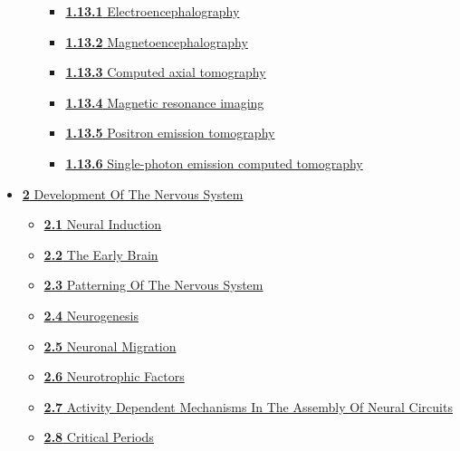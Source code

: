 \begin{itemize}
\begin{itemize}
    \begin{itemize}
    \tightlist
    \item
      \href{the-nervous-system.html\#electroencephalography}{\emph{}\textbf{1.13.1}
      Electroencephalography}
    \item
      \href{the-nervous-system.html\#magnetoencephalography}{\emph{}\textbf{1.13.2}
      Magnetoencephalography}
    \item
      \href{the-nervous-system.html\#computed-axial-tomography}{\emph{}\textbf{1.13.3}
      Computed axial tomography}
    \item
      \href{the-nervous-system.html\#magnetic-resonance-imaging}{\emph{}\textbf{1.13.4}
      Magnetic resonance imaging}
    \item
      \href{the-nervous-system.html\#positron-emission-tomography}{\emph{}\textbf{1.13.5}
      Positron emission tomography}
    \item
      \href{the-nervous-system.html\#single-photon-emission-computed-tomography}{\emph{}\textbf{1.13.6}
      Single-photon emission computed tomography}
    \end{itemize}
  \end{itemize}
\item
  \href{development-of-the-nervous-system-1.html}{\emph{}\textbf{2}
  Development Of The Nervous System}

  \begin{itemize}
  \tightlist
  \item
    \href{development-of-the-nervous-system-1.html\#neural-induction}{\emph{}\textbf{2.1}
    Neural Induction}
  \item
    \href{development-of-the-nervous-system-1.html\#the-early-brain}{\emph{}\textbf{2.2}
    The Early Brain}
  \item
    \href{development-of-the-nervous-system-1.html\#patterning-of-the-nervous-system}{\emph{}\textbf{2.3}
    Patterning Of The Nervous System}
  \item
    \href{development-of-the-nervous-system-1.html\#neurogenesis}{\emph{}\textbf{2.4}
    Neurogenesis}
  \item
    \href{development-of-the-nervous-system-1.html\#neuronal-migration}{\emph{}\textbf{2.5}
    Neuronal Migration}
  \item
    \href{development-of-the-nervous-system-1.html\#neurotrophic-factors}{\emph{}\textbf{2.6}
    Neurotrophic Factors}
  \item
    \href{development-of-the-nervous-system-1.html\#activity-dependent-mechanisms-in-the-assembly-of-neural-circuits}{\emph{}\textbf{2.7}
    Activity Dependent Mechanisms In The Assembly Of Neural Circuits}
  \item
    \href{development-of-the-nervous-system-1.html\#critical-periods}{\emph{}\textbf{2.8}
    Critical Periods}


\end{itemize}
\end{itemize}
